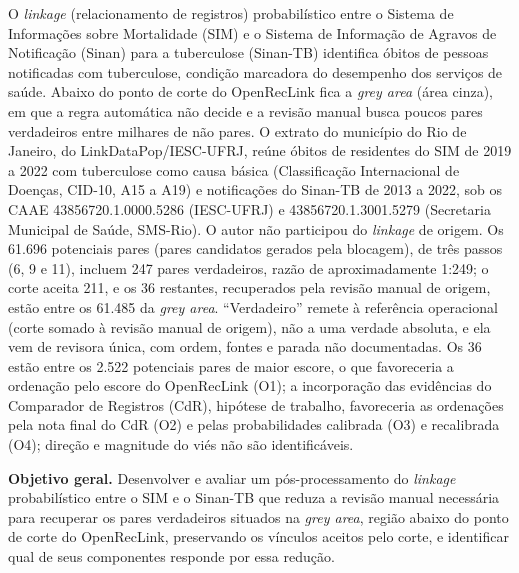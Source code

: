 \documentclass[12pt,a4paper]{article}
\begin{document}
O \textit{linkage} (relacionamento de registros) probabilístico entre o Sistema de Informações sobre Mortalidade (SIM) e o Sistema de Informação de Agravos de Notificação (Sinan) para a tuberculose (Sinan-TB) identifica óbitos de pessoas notificadas com tuberculose, condição marcadora do desempenho dos serviços de saúde. Abaixo do ponto de corte do OpenRecLink fica a \textit{grey area} (área cinza), em que a regra automática não decide e a revisão manual busca poucos pares verdadeiros entre milhares de não pares.
O extrato do município do Rio de Janeiro, do LinkDataPop/IESC-UFRJ, reúne óbitos de residentes do SIM de 2019 a 2022 com tuberculose como causa básica (Classificação Internacional de Doenças, CID-10, A15 a A19) e notificações do Sinan-TB de 2013 a 2022, sob os CAAE 43856720.1.0000.5286 (IESC-UFRJ) e 43856720.1.3001.5279 (Secretaria Municipal de Saúde, SMS-Rio). O autor não participou do \textit{linkage} de origem. %
Os 61.696 potenciais pares (pares candidatos gerados pela blocagem), de três passos (6, 9 e 11), incluem 247 pares verdadeiros, razão de aproximadamente 1:249; o corte aceita 211, e os 36 restantes, recuperados pela revisão manual de origem, estão entre os 61.485 da \textit{grey area}. %
``Verdadeiro'' remete à referência operacional (corte somado à revisão manual de origem), não a uma verdade absoluta, e ela vem de revisora única, com ordem, fontes e parada não documentadas.
Os 36 estão entre os 2.522 potenciais pares de maior escore, o que favoreceria a ordenação pelo escore do OpenRecLink (O1); a incorporação das evidências do Comparador de Registros (CdR), hipótese de trabalho, favoreceria as ordenações pela nota final do CdR (O2) e pelas probabilidades calibrada (O3) e recalibrada (O4); direção e magnitude do viés não são identificáveis. %

\textbf{Objetivo geral.} Desenvolver e avaliar um pós-processamento do \textit{linkage} probabilístico entre o SIM e o Sinan-TB que reduza a revisão manual necessária para recuperar os pares verdadeiros situados na \textit{grey area}, região abaixo do ponto de corte do OpenRecLink, preservando os vínculos aceitos pelo corte, e identificar qual de seus componentes responde por essa redução. %
\end{document}
